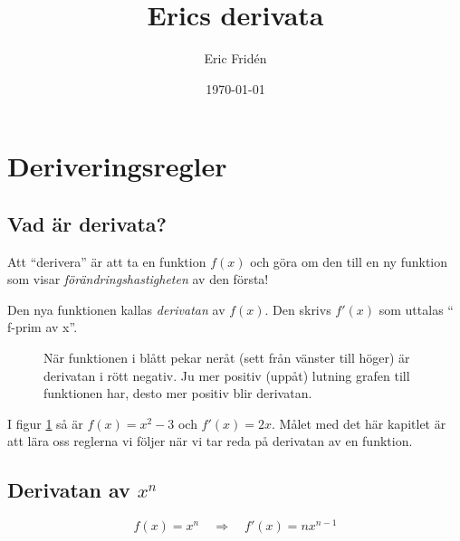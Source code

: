 \documentclass[a4paper, 12pt]{article}
\title{Erics derivata}
\author{Eric Fridén}
\date{\today}
\begin{document}
\newcommand{\ans}[1][5]{= \textcolor{lightgray}{\rule[-.5 em]{#1 em}{.05 em}}}
\newcommand{\imp}{\hspace{1em} \Longrightarrow \hspace{1em}}

\doublespacing
\maketitle

\section{Deriveringsregler}

\subsection{Vad är derivata?}

Att ``derivera'' är att ta en funktion $f(x)$ och göra om den till en ny funktion som visar \emph{förändringshastigheten} av den första!

Den nya funktionen kallas \emph{derivatan} av $f(x)$. Den skrivs $f'(x)$ som uttalas `` f-prim av x''.

\begin{figure}[h]
    \centering
    \caption{När funktionen i blått pekar neråt (sett från vänster till höger) är derivatan i rött negativ. Ju mer positiv (uppåt) lutning grafen till funktionen har, desto mer positiv blir derivatan.}
    \label{fig:1}
\end{figure}

I figur \ref{fig:1} så är $f(x) = x^2 - 3$ och $f'(x) = 2x$. Målet med det här kapitlet är att lära oss reglerna vi följer när vi tar reda på derivatan av en funktion.


\subsection{Derivatan av $x^n$}

\begin{regel}
    \label{reg:x^n}
    \[f(x) = x^n \imp f'(x) = nx^{n-1}\]
\end{regel}
\end{document}
